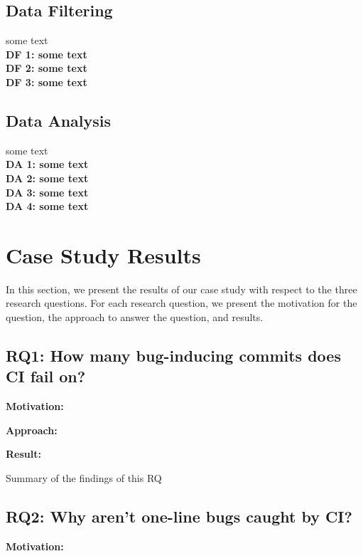 \documentclass[10pt,conference]{IEEEtran}
\newcommand{\conclusion}[1]{\begin{center}\begin{tcolorbox}[skin=widget, left=0.5mm,right=0.5mm,top=0.5mm,bottom=0.5mm,boxrule=0.3mm,arc=0mm,coltitle=black,colframe=black!99!white,colback=white!88!gray,width=(\linewidth),before=\hfill,after=\hfill]#1\end{tcolorbox}\end{center}}
\newcommand{\rqi}{RQ1:  How many bug-inducing commits does CI fail on?}
\newcommand{\rqii}{RQ2: Why aren't one-line bugs caught by CI?}
\begin{document}
\subsection{Data Filtering}
some text \\
\textbf{DF 1: some text \\}
\textbf{DF 2: some text \\}
\textbf{DF 3: some text \\}

\subsection{Data Analysis}
some text \\
\textbf{DA 1: some text \\}
\textbf{DA 2: some text \\}
\textbf{DA 3: some text \\}
\textbf{DA 4: some text \\}

\section{Case Study Results}
In this section, we present the results of our case study with respect to the three research questions. For each research question, we present the motivation for the question, the approach to answer the question, and results.

\subsection*{\rqi}

\noindent\textbf{Motivation:}

\noindent\textbf{Approach:}

\noindent\textbf{Result:}

\conclusion{Summary of the findings of this RQ}

\subsection*{\rqii}

\noindent\textbf{Motivation:}
\end{document}
